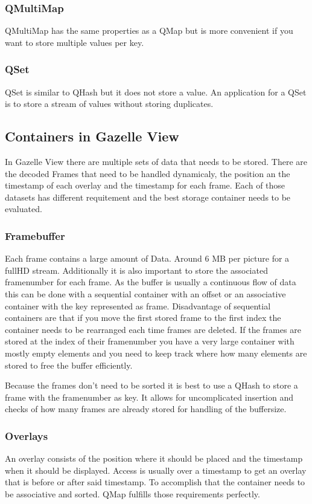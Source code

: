 \subsubsection{QMultiMap}
\label{sec:QMultiMap}
QMultiMap has the same properties as a QMap but is more convenient if you want to store multiple values per key.
\subsubsection{QSet}
\label{sec:QSet}
QSet is similar to QHash but it does not store a value. An application for a QSet is to store a stream of values without storing duplicates.
\subsection{Containers in Gazelle View}
\label{sec:containersGazelleView}
In Gazelle View there are multiple sets of data that needs to be stored. There are the decoded Frames that need to be handled dynamicaly, the position an the timestamp of each overlay and the timestamp for each frame. Each of those datasets has different requitement and the best storage container needs to be evaluated.
\subsubsection{Framebuffer}
\label{sec:frameBuffer}
Each frame contains a large amount of Data. Around 6 MB per picture for a fullHD stream. Additionally it is also important to store the associated framenumber for each frame. As the buffer is usually a continuous flow of data this can be done with a sequential container with an offset or an associative container with the key represented as frame. Disadvantage of sequential containers are that if you move the first stored frame to the first index the container needs to be rearranged each time frames are deleted. If the frames are stored at the index of their framenumber you have a very large container with mostly empty elements and you need to keep track where how many elements are stored to free the buffer efficiently.

Because the frames don't need to be sorted it is best to use a QHash to store a frame with the framenumber as key. It allows for uncomplicated insertion and checks of how many frames are already stored for handling of the buffersize.
\subsubsection{Overlays}
\label{sec:overlays}
An overlay consists of the position where it should be placed and the timestamp when it should be displayed. Access is usually over a timestamp to get an overlay that is before or after said timestamp. To accomplish that the container needs to be associative and sorted. QMap fulfills those requirements perfectly.
